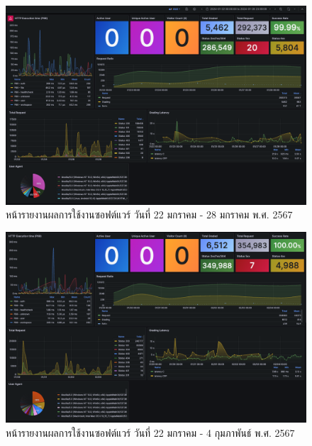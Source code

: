 \documentclass[12pt,one side,openright,a4paper]{cpe-thesis-th}
\begin{document}
\begin{figure}[H]
  \centering
  \includegraphics[width=15cm]{figure/results/grafana/grafana-jan22-jan28.png}
  \caption[หน้ารายงานผลการใช้งานซอฟต์แวร์ วันที่ 22 มกราคม - 28 มกราคม พ.ศ. 2567]{หน้ารายงานผลการใช้งานซอฟต์แวร์ วันที่ 22 มกราคม - 28 มกราคม พ.ศ. 2567}
  \label{fig:res-grafana-j22j28}
\end{figure}

\begin{figure}[H]
  \centering
  \includegraphics[width=15cm]{figure/results/grafana/grafana-jan29-feb04.png}
  \caption[หน้ารายงานผลการใช้งานซอฟต์แวร์ วันที่ 29 มกราคม - 4 กุมภาพันธ์ พ.ศ. 2567]{หน้ารายงานผลการใช้งานซอฟต์แวร์ วันที่ 22 มกราคม - 4 กุมภาพันธ์ พ.ศ. 2567}
  \label{fig:res-grafana-j29f04}
\end{figure}
\end{document}
